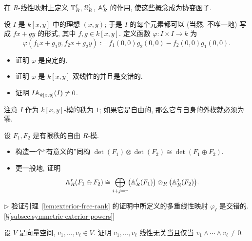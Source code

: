 \begin{prob}\label{ex:tensor-sym-ext-functorial}
在 $R$-线性映射上定义 $\mathbb{T}_R^\ell$, $\mathbb{S}_R^\ell$, $\mathbb{A}_R^\ell$ 的作用, 使这些概念成为协变函子.
\end{prob}

\begin{prob}\label{ex:ideal-wedge-nonzero}
设 $I$ 是 $k[x,y]$ 中的理想 $(x,y)$; 于是 $I$ 的每个元素都可以 (当然, 不唯一地) 写成 $fx+gy$ 的形式, 其中 $f,g\in k[x,y]$. 定义函数 $\varphi:I\times I\to k$ 为
\[
\varphi(f_1x+g_1y,f_2x+g_2y):=f_1(0,0)g_2(0,0)-f_2(0,0)g_1(0,0).
\]
\begin{itemize}
\item 证明 $\varphi$ 是良定的.
\item 证明 $\varphi$ 是 $k[x,y]$-双线性的并且是交错的.
\item 证明 $I\mathbb{A}_{k[x,y]}(I)\neq 0$.
\end{itemize}
注意 $I$ 作为 $k[x,y]$-模的秩为 $1$; 如果它是自由的, 那么它与自身的外楔就必须为零.
\end{prob}

\begin{prob}\label{ex:exterior-direct-sum}
设 $F_1,F_2$ 是有限秩的自由 $R$-模.
\begin{itemize}
\item 构造一个``有意义的''同构 $\det(F_1)\otimes\det(F_2)\cong\det(F_1\oplus F_2)$.
\item 更一般地, 证明
\[
\mathbb{A}_R^r(F_1\oplus F_2)\cong\bigoplus_{i+j=r}\bigl(\mathbb{A}_R^i(F_1)\bigr)\otimes_R\bigl(\mathbb{A}_R^j(F_2)\bigr).
\]
\end{itemize}
\end{prob}

\begin{prob}\label{ex:phi-alternating}
$\triangleright$ 验证引理~\ref{lem:exterior-free-rank} 的证明中所定义的多重线性映射 $\varphi_I$ 是交错的. [§\ref{subsec:symmetric-exterior-powers}]
\end{prob}

\begin{prob}\label{ex:wedge-independent}
设 $V$ 是向量空间, $v_1,\dots,v_\ell\in V$. 证明 $v_1,\dots,v_\ell$ 线性无关当且仅当 $v_1\wedge\cdots\wedge v_\ell\neq0$.
\end{prob}

